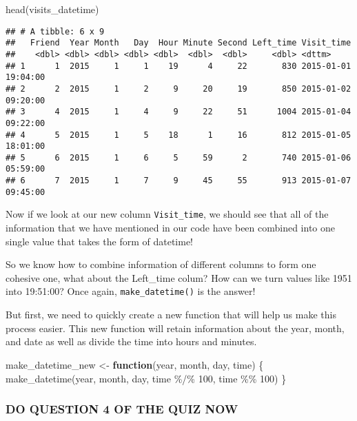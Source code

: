\documentclass[
]{book}
\newenvironment{Shaded}{\begin{snugshade}}{\end{snugshade}}
\newcommand{\ControlFlowTok}[1]{\textcolor[rgb]{0.13,0.29,0.53}{\textbf{#1}}}
\newcommand{\DecValTok}[1]{\textcolor[rgb]{0.00,0.00,0.81}{#1}}
\newcommand{\FunctionTok}[1]{\textcolor[rgb]{0.00,0.00,0.00}{#1}}
\newcommand{\NormalTok}[1]{#1}
\newcommand{\OtherTok}[1]{\textcolor[rgb]{0.56,0.35,0.01}{#1}}
\newcommand{\SpecialCharTok}[1]{\textcolor[rgb]{0.00,0.00,0.00}{#1}}
\begin{document}
\begin{Shaded}
\begin{Highlighting}[]
\FunctionTok{head}\NormalTok{(visits\_datetime)}
\end{Highlighting}
\end{Shaded}

\begin{verbatim}
## # A tibble: 6 x 9
##   Friend  Year Month   Day  Hour Minute Second Left_time Visit_time
##    <dbl> <dbl> <dbl> <dbl> <dbl>  <dbl>  <dbl>     <dbl> <dttm>
## 1      1  2015     1     1    19      4     22       830 2015-01-01 19:04:00
## 2      2  2015     1     2     9     20     19       850 2015-01-02 09:20:00
## 3      4  2015     1     4     9     22     51      1004 2015-01-04 09:22:00
## 4      5  2015     1     5    18      1     16       812 2015-01-05 18:01:00
## 5      6  2015     1     6     5     59      2       740 2015-01-06 05:59:00
## 6      7  2015     1     7     9     45     55       913 2015-01-07 09:45:00
\end{verbatim}

Now if we look at our new column \texttt{Visit\_time}, we should see that all of the information that we have mentioned in our code have been combined into one single value that takes the form of datetime!

So we know how to combine information of different columns to form one cohesive one, what about the Left\_time colum? How can we turn values like 1951 into 19:51:00? Once again, \texttt{make\_datetime()} is the answer!

But first, we need to quickly create a new function that will help us make this process easier. This new function will retain information about the year, month, and date as well as divide the time into hours and minutes.

\begin{Shaded}
\begin{Highlighting}[]
\NormalTok{make\_datetime\_new }\OtherTok{\textless{}{-}} \ControlFlowTok{function}\NormalTok{(year, month, day, time) \{}
  \FunctionTok{make\_datetime}\NormalTok{(year, month, day, time }\SpecialCharTok{\%/\%} \DecValTok{100}\NormalTok{, time }\SpecialCharTok{\%\%} \DecValTok{100}\NormalTok{)}
\NormalTok{\}}
\end{Highlighting}
\end{Shaded}

\hypertarget{do-question-4-of-the-quiz-now-2}{%
\subsubsection{DO QUESTION 4 OF THE QUIZ NOW}\label{do-question-4-of-the-quiz-now-2}}
\end{document}

